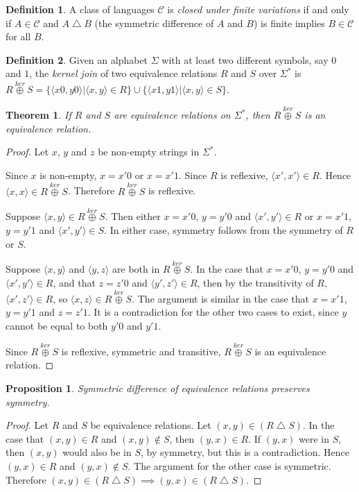 \documentclass{article}
\newtheorem{theorem}{Theorem}[section]
\newtheorem{proposition}[proposition]{Proposition}
\theoremstyle{definition} \newtheorem{definition}[definition]{Definition}
\newcommand{\kj}{\overset{ker}{\oplus}} %
\newcommand{\symdiff}{\bigtriangleup} %
\newcommand{\defn}[1]{\emph{#1}} %
\newcommand{\pair}[2]{\langle#1,#2\rangle} %
\begin{document}
\begin{definition}
  A class of languages $\mathcal{C}$ is \defn{closed under finite variations} if and only if $A\in \mathcal{C}$ and $A\symdiff B$ (the symmetric difference of $A$ and $B$) is finite implies $B\in \mathcal{C}$ for all $B$.
\end{definition}

\begin{definition}
  Given an alphabet $\Sigma$ with at least two different symbols, say $0$ and $1$, the \defn{kernel join} of two equivalence relations $R$ and $S$ over $\Sigma^*$ is $R\kj S=\{\pair{x0}{y0}|\pair{x}{y}\in R\}\cup\{\pair{x1}{y1}|\pair{x}{y}\in S\}$.
\end{definition}

\begin{theorem}
  If $R$ and $S$ are equivalence relations on $\Sigma^*$, then $R\kj S$ is an equivalence relation.
\end{theorem}
\begin{proof}
  Let $x$, $y$ and $z$ be non-empty strings in $\Sigma^*$.
  
  Since $x$ is non-empty, $x=x'0$ or $x=x'1$.
  Since $R$ is reflexive, $\pair{x'}{x'}\in R$.
  Hence $\pair{x}{x}\in R\kj S$.
  Therefore $R\kj S$ is reflexive.
  
  Suppose $\pair{x}{y}\in R\kj S$.
  Then either $x=x'0$, $y=y'0$ and $\pair{x'}{y'}\in R$ or $x=x'1$, $y=y'1$ and $\pair{x'}{y'}\in S$.
  In either case, symmetry follows from the symmetry of $R$ or $S$.

  Suppose $\pair{x}{y}$ and $\pair{y}{z}$ are both in $R\kj S$.
  In the case that $x=x'0$, $y=y'0$ and $\pair{x'}{y'}\in R$, and that $z=z'0$ and $\pair{y'}{z'}\in R$, then by the transitivity of $R$, $\pair{x'}{z'}\in R$, so $\pair{x}{z}\in R\kj S$.
  The argument is similar in the case that $x=x'1$, $y=y'1$ and $z=z'1$.
  It is a contradiction for the other two cases to exist, since $y$ cannot be equal to both $y'0$ and $y'1$.

  Since $R\kj S$ is reflexive, symmetric and transitive, $R\kj S$ is an equivalence relation.
\end{proof}

\begin{proposition}\label{prop:symdiff}
  Symmetric difference of equivalence relations preserves symmetry.
\end{proposition}
\begin{proof}
  Let $R$ and $S$ be equivalence relations.
  Let $(x,y)\in(R\symdiff S)$.
  In the case that $(x,y)\in R$ and $(x,y)\notin S$, then $(y,x)\in R$.
  If $(y,x)$ were in $S$, then $(x,y)$ would also be in $S$, by symmetry, but this is a contradiction.
  Hence $(y,x)\in R$ and $(y,x)\notin S$.
  The argument for the other case is symmetric.
  Therefore $(x,y)\in(R\symdiff S)\implies (y,x)\in(R\symdiff S)$.
\end{proof}
\end{document}
